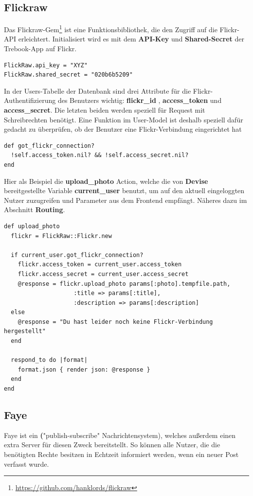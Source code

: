 \documentclass[10pt,a4paper]{book}
\begin{document}
\subsection{Flickraw}
Das Flickraw-Gem\footnote{\href{https://github.com/hanklords/flickraw}{https://github.com/hanklords/flickraw}} ist eine Funktionsbibliothek, 
die den Zugriff auf die Flickr-API erleichtert. Initialisiert wird es mit dem \textbf{API-Key} und \textbf{Shared-Secret} der Trebook-App auf Flickr.
\begin{lstlisting}
FlickRaw.api_key = "XYZ"
FlickRaw.shared_secret = "020b6b5209"
\end{lstlisting}
In der Users-Tabelle der Datenbank sind drei Attribute für die Flickr-Authentifizierung des Benutzers wichtig: \textbf{flickr\_id} , 
\textbf{access\_token} und \textbf{access\_secret}. Die letzten beiden werden speziell für Request mit Schreibrechten benötigt. Eine Funktion im User-Model ist deshalb speziell dafür gedacht zu überprüfen, ob der Benutzer eine Flickr-Verbindung eingerichtet hat
\begin{lstlisting}
def got_flickr_connection?
  !self.access_token.nil? && !self.access_secret.nil?
end
\end{lstlisting}
Hier als Beispiel die \textbf{upload\_photo} Action, welche die von \textbf{Devise} bereitgestellte Variable \textbf{current\_user} benutzt,
um auf den aktuell eingeloggten Nutzer zuzugreifen und Parameter aus dem Frontend empfängt. Näheres dazu im Abschnitt \textbf{Routing}.
\begin{lstlisting}
def upload_photo
  flickr = FlickRaw::Flickr.new

  if current_user.got_flickr_connection?
    flickr.access_token = current_user.access_token
    flickr.access_secret = current_user.access_secret
    @response = flickr.upload_photo params[:photo].tempfile.path, 
    				:title => params[:title], 
    				:description => params[:description]
  else
    @response = "Du hast leider noch keine Flickr-Verbindung hergestellt"
  end

  respond_to do |format|
    format.json { render json: @response }
  end
end
\end{lstlisting}
\subsection{Faye}
Faye ist ein \textbf("publish-subscribe" Nachrichtensystem), welches außerdem einen extra Server für diesen Zweck bereitstellt. So können alle Nutzer, die die benötigten Rechte besitzen in Echtzeit informiert werden, wenn ein neuer Post verfasst wurde.
\end{document}
